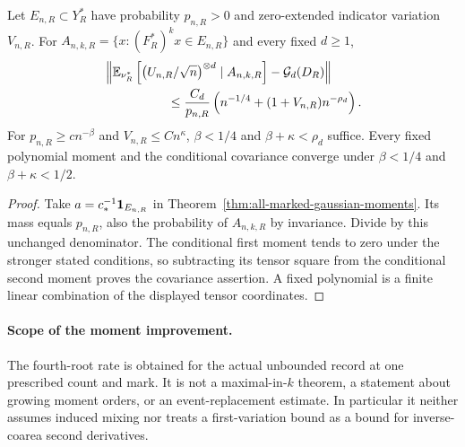 \begin{corollary}
\label{cor:all-same-event-moments}
Let $E_{n,R}\subset Y_R^*$ have probability $p_{n,R}>0$ and
zero-extended indicator variation $V_{n,R}$. For
$A_{n,k,R}=\{x:(F_R^*)^kx\in E_{n,R}\}$ and every fixed $d\ge1$,
\begin{align}
 &\left\|\mathbb E_{\nu_R^*}
   \left[\left(U_{n,R}/\sqrt n\right)^{\otimes d}\mid A_{n,k,R}\right]
                       -\mathcal G_d(D_R)\right\|\notag\\
 &\hspace{18mm}\le\frac{C_d}{p_{n,R}}
         \left(n^{-1/4}+(1+V_{n,R})n^{-\rho_d}\right).
 \label{eq:all-same-event-moments}
\end{align}
For $p_{n,R}\ge cn^{-\beta}$ and $V_{n,R}\le Cn^\kappa$,
$\beta<1/4$ and $\beta+\kappa<\rho_d$ suffice. Every fixed
polynomial moment and the conditional covariance converge under
$\beta<1/4$ and $\beta+\kappa<1/2$.
\end{corollary}
\begin{proof}
Take $a=c_*^{-1}\mathbf1_{E_{n,R}}$ in
Theorem~\ref{thm:all-marked-gaussian-moments}. Its mass equals
$p_{n,R}$, also the probability of $A_{n,k,R}$ by invariance.
Divide by this unchanged denominator. The conditional first moment
tends to zero under the stronger stated conditions, so subtracting
its tensor square from the conditional second moment proves the
covariance assertion. A fixed polynomial is a finite linear
combination of the displayed tensor coordinates.
\end{proof}

\paragraph{Scope of the moment improvement.}
The fourth-root rate is obtained for the actual unbounded record at
one prescribed count and mark. It is not a maximal-in-$k$ theorem,
a statement about growing moment orders, or an event-replacement
estimate. In particular it neither assumes induced mixing nor treats
a first-variation bound as a bound for inverse-coarea second derivatives.
